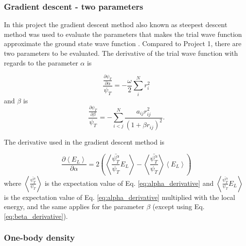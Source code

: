 \subsubsection{Gradient descent - two parameters}

In this project the gradient descent method also known as steepest descent method  was used to evaluate the parameters that makes the trial wave function approximate the ground state wave function \cite{gradient_descent}. Compared to Project 1, there are two parameters to be evaluated. The derivative of the trial wave function with regards to the parameter $\alpha$ is 

\begin{equation}\label{eq:alpha_derivative}
\frac{\frac{\partial \psi_T}{\partial \alpha}}{\psi_T} = -\frac{\omega}{2}\sum_i^N r_i^2
\end{equation}
and $\beta$ is
\begin{equation}\label{eq:beta_derivative}
\frac{\frac{\partial \psi_T}{\partial \beta}}{\psi_T} = - \sum_{i<j}^N \frac{a_{ij}r_{ij}^2}{(1+\beta r_{ij})^2}.
\end{equation}

The derivative used in the gradient descent method is 

\begin{equation}
\frac{\partial \left< E_L \right>}{\partial \alpha} = 2  \left( \left<\frac{\bar{\psi_T^{\alpha}}}{\psi_T}E_L\right> -\left<\frac{\bar{\psi_T^{\alpha}}}{\psi_T}\right>\left<E_L\right> \right)
\end{equation}
where $\left<\frac{\bar{\psi_T^{\alpha}}}{\psi_T}\right>$ is the expectation value of Eq. \ref{eq:alpha_derivative} and $\left<\frac{\bar{\psi_T^{\alpha}}}{\psi_T}E_L\right>$ is the expectation value of Eq. \ref{eq:alpha_derivative} multiplied with the local energy, and the same applies for the parameter $\beta$ (except using Eq. \ref{eq:beta_derivative}). 

\subsubsection{One-body density}


